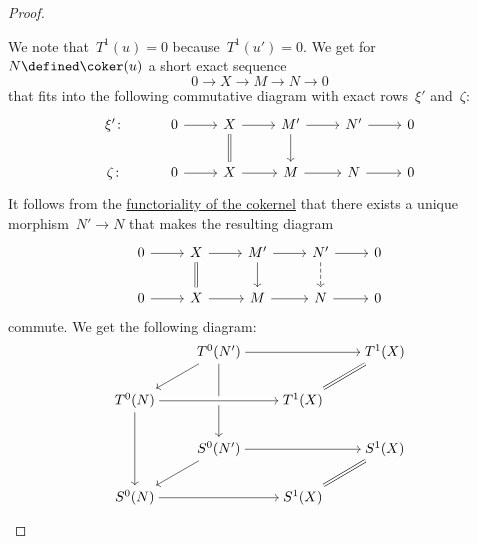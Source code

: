 \begin{proof}
\begin{enumerate}
      We note that~$T^1(u) = 0$ because~$T^1(u') = 0$.
      We get for~$N \defined \coker(u)$ a short exact sequence
      \[
        0
        \to
        X
        \to
        M
        \to
        N
        \to
        0
      \]
      that fits into the following commutative diagram with exact rows~$\xi'$ and~$\zeta$:
      \[
        \begin{tikzcd}
            \xi'
            \colon
          & 0
            \arrow{r}
          & X
            \arrow{r}
            \arrow[equal]{d}
          & M'
            \arrow{r}
            \arrow{d}
          & N'
            \arrow{r}
          & 0
          \\
            \zeta
            \colon
          & 0
            \arrow{r}
          & X
            \arrow{r}
          & M
            \arrow{r}
          & N
            \arrow{r}
          & 0
        \end{tikzcd}
      \]
      It follows from the \hyperref[functoriality of (co)kernel]{functoriality of the cokernel} that there exists a unique morphism~$N' \to N$ that makes the resulting diagram
      \[
        \begin{tikzcd}
            0
            \arrow{r}
          & X
            \arrow{r}
            \arrow[equal]{d}
          & M'
            \arrow{r}
            \arrow{d}
          & N'
            \arrow{r}
            \arrow[dashed]{d}
          & 0
          \\
            0
            \arrow{r}
          & X
            \arrow{r}
          & M
            \arrow{r}
          & N
            \arrow{r}
          & 0
        \end{tikzcd}
      \]
      commute.
      We get the following diagram:
      \[
        \begin{tikzcd}[cramped]
            {}
          & T^0(N')
            \arrow{rr}
            \arrow{dd}
            \arrow{dl}
          & {}
          & T^1(X)
            \arrow[equal]{dl}
          \\
            T^0(N)
            \arrow{rr}
            \arrow{dd}
          & {}
          & T^1(X)
            \arrow[from=ll, crossing over]
          & {}
          \\
            {}
          & S^0(N')
            \arrow{rr}
            \arrow{dl}
          & {}
          & S^1(X)
            \arrow[equal]{dl}
          \\
            S^0(N)
            \arrow{rr}
          & {}
          & S^1(X)
          & {}
        \end{tikzcd}
\]
\end{enumerate}
\end{proof}
